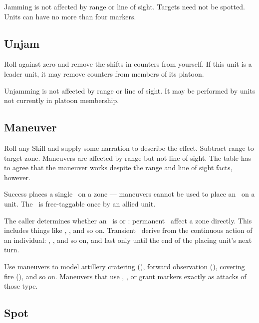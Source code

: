 Jamming is not affected by range or line of sight. Targets need not be spotted. Units can have no more than four \OOC{} markers.

\subsection{Unjam}\label{sec:platoon-combat-unjam} %

Roll  against zero and remove the shifts in \OOC{} counters from yourself. If this unit is a leader unit, it may remove \OOC{} counters from members of its platoon.

Unjamming is not affected by range or line of sight. It may be performed by units not currently in platoon membership.

\subsection{Maneuver}\label{sec:platoon-combat-maneuver}

Roll any Skill and supply some narration to describe the effect. 
Subtract range to target zone. 
Maneuvers are affected by range but not line of sight. 
The table has to agree that the maneuver works despite the range and line of sight facts, however.

Success places a single \Aspect\ on a zone --- maneuvers cannot be used to place an \Aspect\ on a unit.
The \Aspect\ is free-taggable once by an allied unit. 

The caller determines whether an \Aspect\ is  or :
permanent \Aspects\ affect a zone directly. This includes things like , , and so on. 
Transient \Aspects\ derive from the continuous action of an individual: , , and so on, and last only until the end of the placing unit's next turn.

Use maneuvers to model artillery cratering (), forward observation (), covering fire (), and so on. Maneuvers that use , , or  grant \SPOTTED{} markers exactly as attacks of those type.



\subsection{Spot}\label{sec:platoon-combat-spot}

